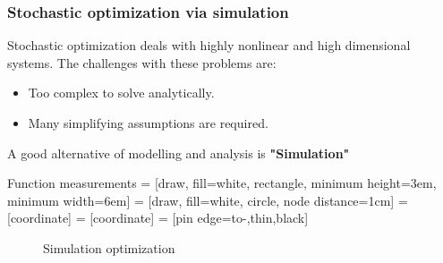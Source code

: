 \begin{frame}
\frametitle{\centering  Stochastic optimization via simulation}
\begin{small}
\begin{block}{}
Stochastic optimization deals with  highly nonlinear and high dimensional systems. The challenges with these problems are:
\begin{itemize}
\item Too complex to solve analytically.
\item Many simplifying assumptions are  required.
\end{itemize}
\end{block}
\begin{block}{}
A good alternative of modelling and analysis is \textbf{"Simulation"}
\end{block}
\begin{block}{Function measurements}
 = [draw, fill=white, rectangle,
   minimum height=3em, minimum width=6em]
 = [draw, fill=white, circle, node distance=1cm]
 = [coordinate]
 = [coordinate]
 = [pin edge={to-,thin,black}]

 \begin{figure}[t]
    \centering
{}
\caption{Simulation optimization}
\label{fig:so}
\end{figure}

\end{block}
\end{small}
\end{frame}




